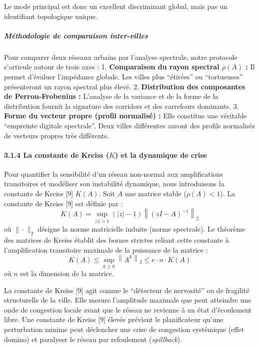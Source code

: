\documentclass[10pt, a4paper]{article}
\begin{document}
Le mode principal est donc un excellent discriminant global, mais pas un
identifiant topologique unique.

\subparagraph{Méthodologie de comparaison
inter-villes}\label{muxe9thodologie-de-comparaison-inter-villes}

Pour comparer deux réseaux urbains par l'analyse spectrale, notre
protocole s'articule autour de trois axes : 1. \textbf{Comparaison du
rayon spectral \(\rho(A)\) :} Il permet d'évaluer l'impédance globale.
Les villes plus ``étirées'' ou ``tortueuses'' présenteront un rayon
spectral plus élevé. 2. \textbf{Distribution des composantes de
Perron-Frobenius :} L'analyse de la variance et de la forme de la
distribution fournit la signature des corridors et des carrefours
dominants. 3. \textbf{Forme du vecteur propre (profil normalisé) :} Elle
constitue une véritable ``empreinte digitale spectrale''. Deux villes
différentes auront des profils normalisés de vecteurs propres très
différents.

\paragraph{\texorpdfstring{3.1.4 La constante de Kreiss (\(K\)) et la
dynamique de
crise}{3.1.4 La constante de Kreiss (K) et la dynamique de crise}}\label{la-constante-de-kreiss-k-et-la-dynamique-de-crise}

Pour quantifier la sensibilité d'un réseau non-normal aux amplifications
transitoires et modéliser son instabilité dynamique, nous introduisons
la constante de Kreiss {[}9{]} \(K(A)\). Soit \(A\) une matrice stable
(\(\rho(A) < 1\)). La constante de Kreiss {[}9{]} est définie par :
\[K(A) = \sup _{|z| > 1} (|z| - 1) \left\| (zI - A)^{-1} \right\|_2\] où
\(\|\cdot\|_2\) désigne la norme matricielle induite (norme spectrale).
Le théorème des matrices de Kreiss établit des bornes strictes reliant
cette constante à l'amplification transitoire maximale de la puissance
de la matrice :
\[K(A) \le \sup_{k \ge 0} \left\| A^k \right\|_2 \le e \cdot n \cdot K(A)\]
où \(n\) est la dimension de la matrice.

La constante de Kreiss {[}9{]} agit comme le ``détecteur de nervosité''
ou de fragilité structurelle de la ville. Elle mesure l'amplitude
maximale que peut atteindre une onde de congestion locale avant que le
réseau ne revienne à un état d'écoulement libre. Une constante de Kreiss
{[}9{]} élevée prévient le planificateur qu'une perturbation minime peut
déclencher une crise de congestion systémique (effet domino) et
paralyser le réseau par refoulement (\emph{spillback}).
\end{document}
